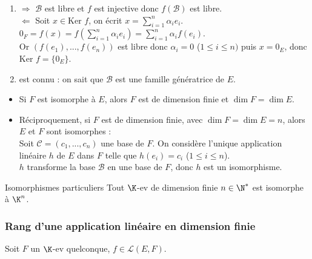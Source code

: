 \documentclass[12pt, a4paper]{report}
\begin{document}
\begin{demo}{}
\begin{enumerate}
	\item $\Longrightarrow$ $\mathcal{B}$ est libre et $f$ est injective donc $f(\mathcal{B})$ est libre. \\
	$\Longleftarrow$ Soit $x \in \text{Ker }f$, on écrit $x = \displaystyle{\sum_{i=1}^n \alpha_ie_i}$. \\
	$0_F = f(x) = f \left(\displaystyle{\sum_{i=1}^n \alpha_ie_i}\right) = \displaystyle{\sum_{i=1}^n\alpha_if(e_i)}$. \\
	Or $(f(e_1),...,f(e_n))$ est libre donc $\alpha_i = 0$ ($1 \le i \le n)$ puis $x = 0_E$, donc $\text{Ker }f = \{0_E\}$. \\
	\item est connu : on sait que $\mathcal{B}$ est une famille génératrice de $E$.
\end{enumerate}
\end{demo}

\begin{remarque}{}
\begin{itemize}
	\item Si $F$ est isomorphe à $E$, alors $F$ est de dimension finie et $\dim F = \dim E$.
	\item Réciproquement, si $F$ est de dimension finie, avec $\dim F = \dim E =n$, alors $E$ et $F$ sont isomorphes : \\
	Soit $\mathcal{C} = (c_1,...,c_n)$ une base de $F$. On considère l'unique application linéaire $h$ de $E$ dans $F$ telle que $h(e_i) = c_i$ ($1 \le i \le n$). \\
	$h$ transforme la base $\mathcal{B}$ en une base de $F$, donc $h$ est un isomorphisme.
\end{itemize}
\end{remarque}

\begin{corollaire}{Isomorphismes particuliers}{}
Tout $\K$-ev de dimension finie $n \in \N^*$ est isomorphe à $\K^n$.
\end{corollaire}

\subsubsection{Rang d'une application linéaire en dimension finie}

Soit $F$ un $\K$-ev quelconque, $f \in \mathcal{L}(E,F)$.
\end{document}
